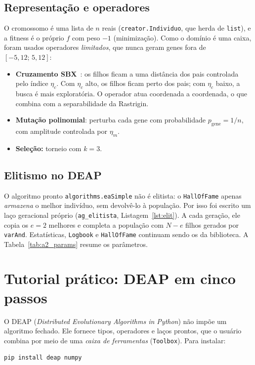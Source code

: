 \documentclass[conference]{IEEEtran}
\newcommand{\deap}{\textsc{DEAP}}
\newcommand{\code}[1]{\texttt{#1}}
\begin{document}
\subsection{Representação e operadores}
O cromossomo é uma lista de $n$ reais (\code{creator.Individuo}, que herda de \code{list}), e a fitness é o próprio $f$ com peso $-1$ (minimização). Como o domínio é uma caixa, foram usados operadores \emph{limitados}, que nunca geram genes fora de $[-5{,}12;\,5{,}12]$:
\begin{itemize}
\item \textbf{Cruzamento SBX}~\cite{deb1995sbx}: os filhos ficam a uma distância dos pais controlada pelo índice $\eta_c$. Com $\eta_c$ alto, os filhos ficam perto dos pais; com $\eta_c$ baixo, a busca é mais exploratória. O operador atua coordenada a coordenada, o que combina com a separabilidade da Rastrigin.
\item \textbf{Mutação polinomial}: perturba cada gene com probabilidade $p_{\text{gene}}=1/n$, com amplitude controlada por $\eta_m$.
\item \textbf{Seleção:} torneio com $k=3$.
\end{itemize}

\subsection{Elitismo no DEAP}
O algoritmo pronto \code{algorithms.eaSimple} não é elitista: o \code{HallOfFame} apenas \emph{armazena} o melhor indivíduo, sem devolvê-lo à população. Por isso foi escrito um laço geracional próprio (\code{ag\_elitista}, Listagem~\ref{lst:elit}). A cada geração, ele copia os $e=2$ melhores e completa a população com $N-e$ filhos gerados por \code{varAnd}. Estatísticas, \code{Logbook} e \code{HallOfFame} continuam sendo os da biblioteca. A Tabela~\ref{tab:a2_params} resume os parâmetros.



\section{Tutorial prático: DEAP em cinco passos}
\label{sec:tutorial}
O \deap{} (\emph{Distributed Evolutionary Algorithms in Python}) não impõe um algoritmo fechado. Ele fornece tipos, operadores e laços prontos, que o usuário combina por meio de uma \emph{caixa de ferramentas} (\code{Toolbox}). Para instalar:
\begin{lstlisting}[language=bash,numbers=none]
pip install deap numpy
\end{lstlisting}
\end{document}
